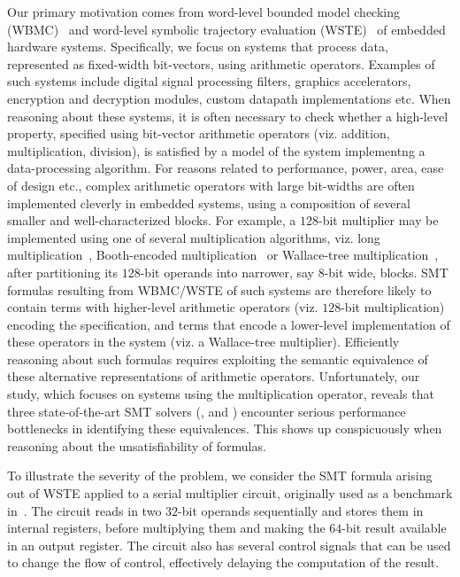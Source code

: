 Our primary motivation comes from word-level bounded model checking
(WBMC)~\cite{cbmc,hwcbmc} and word-level symbolic trajectory
evaluation (WSTE)~\cite{wste} of embedded hardware systems.
Specifically, we focus on systems that process data, represented as
fixed-width bit-vectors, using arithmetic operators.  Examples of such
systems include digital signal processing filters, graphics
accelerators, encryption and decryption modules, custom datapath
implementations etc.  When reasoning about these systems, it is often
necessary to check whether a high-level property, specified using
bit-vector arithmetic operators (viz. addition, multiplication,
division), is satisfied by a model of the system implementng a
data-processing algorithm.  For reasons related to performance, power,
area, ease of design etc., complex arithmetic operators with large
bit-widths are often implemented cleverly in embedded systems, using a
composition of several smaller and well-characterized blocks.  For
example, a $128$-bit multiplier may be implemented using one of
several multiplication algorithms, viz. long
multiplication~\cite{long}, Booth-encoded
multiplication~\cite{booth} or Wallace-tree
multiplication~\cite{wallace}, after partitioning its $128$-bit
operands into narrower, say $8$-bit wide, blocks.  SMT formulas
resulting from WBMC/WSTE of such systems are therefore likely to
contain terms with higher-level arithmetic operators (viz. $128$-bit
multiplication) encoding the specification, and terms that encode a
lower-level implementation of these operators in the system (viz. a
Wallace-tree multiplier).  Efficiently reasoning about such formulas
requires exploiting the semantic equivalence of these alternative
representations of arithmetic operators.  Unfortunately, our study,
which focuses on systems using the multiplication operator, reveals
that three state-of-the-art SMT solvers ({\zthree}, {\cvcfour} and
{\boolector}) encounter serious performance bottlenecks in identifying
these equivalences.  This shows up conspicuously when reasoning about
the unsatisfiability of formulas.

 To illustrate
the severity of the problem, we consider the SMT formula arising out
of WSTE applied to a serial multiplier circuit, originally used as a
benchmark in~\cite{wste}.  The circuit reads in two $32$-bit operands
sequentially and stores them in internal registers, before multiplying
them and making the $64$-bit result available in an output register.
The circuit also has several control signals that can be used to
change the flow of control, effectively delaying the computation of
the result.


